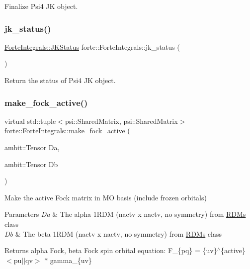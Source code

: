 Finalize Psi4 JK object. 

\mbox{\label{classforte_1_1_forte_integrals_afdaad0b6e254794d8f1911cd786367f0}} 
\subsubsection{\texorpdfstring{jk\+\_\+status()}{jk\_status()}}
{\footnotesize\ttfamily \mbox{\hyperlink{classforte_1_1_forte_integrals_a5ef066e57ff1494e90669779b1d0ecc2}{Forte\+Integrals\+::\+J\+K\+Status}} forte\+::\+Forte\+Integrals\+::jk\+\_\+status (\begin{DoxyParamCaption}{ }\end{DoxyParamCaption})}



Return the status of Psi4 JK object. 

\mbox{\label{classforte_1_1_forte_integrals_a1dda7858e1766c9869b58eeda81d5a21}} 
\subsubsection{\texorpdfstring{make\+\_\+fock\+\_\+active()}{make\_fock\_active()}}
{\footnotesize\ttfamily virtual std\+::tuple$<$psi\+::\+Shared\+Matrix, psi\+::\+Shared\+Matrix$>$ forte\+::\+Forte\+Integrals\+::make\+\_\+fock\+\_\+active (\begin{DoxyParamCaption}\item[{ambit\+::\+Tensor}]{Da,  }\item[{ambit\+::\+Tensor}]{Db }\end{DoxyParamCaption})\hspace{0.3cm}{\ttfamily [pure virtual]}}

Make the active Fock matrix in MO basis (include frozen orbitals) 
\begin{DoxyParams}{Parameters}
{\em Da} & The alpha 1\+R\+DM (nactv x nactv, no symmetry) from \mbox{\hyperlink{classforte_1_1_r_d_ms}{R\+D\+Ms}} class \\
\hline
{\em Db} & The beta 1\+R\+DM (nactv x nactv, no symmetry) from \mbox{\hyperlink{classforte_1_1_r_d_ms}{R\+D\+Ms}} class \\
\hline
\end{DoxyParams}
\begin{DoxyReturn}{Returns}
alpha Fock, beta Fock spin orbital equation\+: F\+\_\+\{pq\} = \{uv\}$^\wedge$\{active\} $<$pu$\vert$$\vert$qv$>$ $\ast$ gamma\+\_\+\{uv\} 
\end{DoxyReturn}


